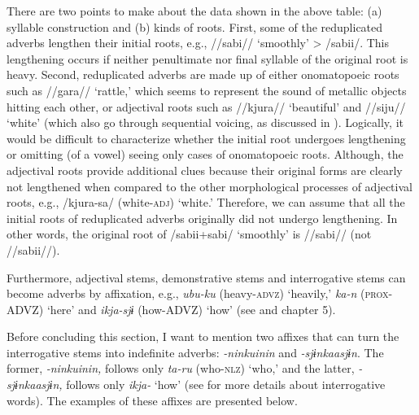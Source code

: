 There are two points to make about the data shown in the above table: (a) syllable construction and (b) kinds of roots. First, some of the reduplicated adverbs lengthen their initial roots, e.g., //sabi// ‘smoothly’ > /sabii/. This lengthening occurs if neither penultimate nor final syllable of the original root is heavy. Second, reduplicated adverbs are made up of either onomatopoeic roots such as //gara// ‘rattle,’ which seems to represent the sound of metallic objects hitting each other, or adjectival roots such as //kjura// ‘beautiful’ and //siju// ‘white’ (which also go through sequential voicing, as discussed in ). Logically, it would be difficult to characterize whether the initial root undergoes lengthening or omitting (of a vowel) seeing only cases of onomatopoeic roots. Although, the adjectival roots provide additional clues because their original forms are clearly not lengthened when compared to the other morphological processes of adjectival roots, e.g., /kjura-sa/ (white-\textsc{adj}) ‘white.’ Therefore, we can assume that all the initial roots of reduplicated adverbs originally did not undergo lengthening. In other words, the original root of /sabii+sabi/ ‘smoothly’ is //sabi// (not //sabii//).

Furthermore, adjectival stems, demonstrative stems and interrogative stems can become adverbs by affixation, e.g., \textit{ubu-ku} (heavy-\textsc{advz}) ‘heavily,’ \textit{ka-n} (\textsc{prox}-ADVZ) ‘here’ and \textit{ikja-sjɨ} (how-ADVZ) ‘how’ (see  and chapter 5).

Before concluding this section, I want to mention two affixes that can turn the interrogative stems into indefinite adverbs: \textit{{}-ninkuinin} and \textit{{}-sjɨnkaasjɨn}. The former, \textit{{}-ninkuinin,} follows only \textit{ta-ru} (who-\textsc{nlz}) ‘who,’ and the latter, \textit{{}-sjɨnkaasjɨn,} follows only \textit{ikja-} ‘how’ (see  for more details about interrogative words). The examples of these affixes are presented below.

